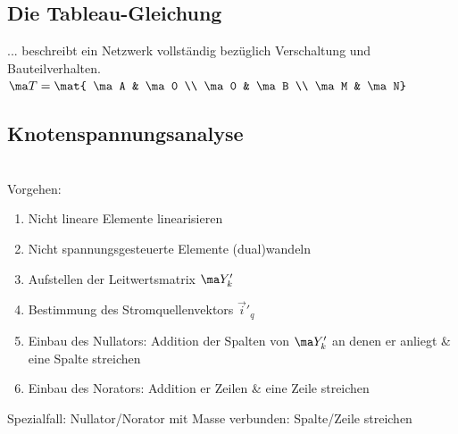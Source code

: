 \documentclass[fs, footer]{latex4ei}
\begin{document}
\begin{multicols*}{4}
	\subsection{Die Tableau-Gleichung}
	... beschreibt ein Netzwerk vollständig bezüglich Verschaltung und Bauteilverhalten.
	$\ma T = \mat{ \ma A & \ma 0 \\ \ma 0 & \ma B \\ \ma M & \ma N}$



	\subsection{Knotenspannungsanalyse}
\\
Vorgehen:
\begin{enumerate}\itemsep0pt
	\item Nicht lineare Elemente linearisieren
	\item Nicht spannungsgesteuerte Elemente (dual)wandeln
	\item Aufstellen der Leitwertsmatrix $\ma Y'_k$
	\item Bestimmung des Stromquellenvektors $\vec i'_q$
	\item Einbau des Nullators: Addition der Spalten von $\ma Y'_k$ an denen er anliegt \& eine Spalte streichen
	\item Einbau des Norators: Addition er Zeilen \& eine Zeile streichen

\end{enumerate}
Spezialfall: Nullator/Norator mit Masse verbunden: Spalte/Zeile streichen

\end{multicols*}
\end{document}
